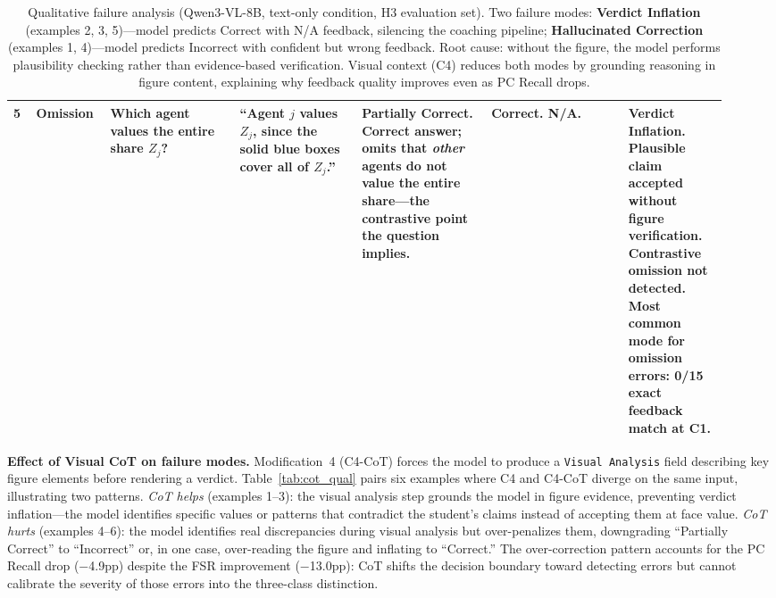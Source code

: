 \documentclass{article}
\begin{document}
\begin{table}[!ht]
\begin{tabular}{@{}p{0.03\linewidth}p{0.09\linewidth}p{0.17\linewidth}p{0.16\linewidth}p{0.17\linewidth}p{0.18\linewidth}p{0.13\linewidth}@{}}
\midrule
5 &
Omission &
Which agent values the entire share $Z_j$? &
``Agent $j$ values $Z_j$, since the solid blue boxes cover all of $Z_j$.'' &
\textbf{Partially Correct.} Correct answer; omits that \emph{other} agents do not value the entire share---the contrastive point the question implies. &
\textbf{Correct. N/A.} &
\textbf{Verdict Inflation.} Plausible claim accepted without figure verification. Contrastive omission not detected. Most common mode for omission errors: 0/15 exact feedback match at C1. \\
\bottomrule
\end{tabular}
\caption{ Qualitative failure analysis (Qwen3-VL-8B, text-only condition, H3 evaluation
set). Two failure modes: \textbf{Verdict Inflation} (examples 2, 3, 5)---model predicts Correct
with N/A feedback, silencing the coaching pipeline; \textbf{Hallucinated Correction}
(examples 1, 4)---model predicts Incorrect with confident but wrong feedback. Root cause: without
the figure, the model performs plausibility checking rather than evidence-based
verification. Visual context (C4) reduces both modes by grounding reasoning in figure
content, explaining why feedback quality improves even as PC Recall drops.}
\label{tab:qual}
\end{table}

\medskip
\noindent\textbf{Effect of Visual CoT on failure modes.}
Modification~4 (C4-CoT) forces the model to produce a \texttt{Visual Analysis}
field describing key figure elements before rendering a verdict. Table~\ref{tab:cot_qual}
pairs six examples where C4 and C4-CoT diverge on the same input, illustrating two
patterns. \textit{CoT helps} (examples 1--3): the visual analysis step
grounds the model in figure evidence, preventing verdict inflation---the model
identifies specific values or patterns that contradict the student's claims instead
of accepting them at face value. \textit{CoT hurts} (examples 4--6): the model
identifies real discrepancies during visual analysis but over-penalizes them,
downgrading ``Partially Correct'' to ``Incorrect'' or, in one case, over-reading
the figure and inflating to ``Correct.'' The over-correction pattern accounts for
the PC Recall drop ($-$4.9pp) despite the FSR improvement ($-$13.0pp): CoT
shifts the decision boundary toward detecting errors but cannot calibrate the
severity of those errors into the three-class distinction.
\end{document}
